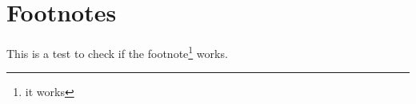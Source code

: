 \documentclass[12pt]{article}
\begin{document}
\section{Footnotes}

This is a test to check if the footnote\footnote{it works} works.
\end{document}
